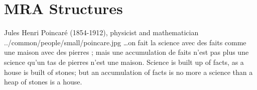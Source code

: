 ﻿%


\chapter{MRA Structures}
\qboxnpqt
  { Jules Henri Poincar\'e (1854-1912), physicist and mathematician
    \footnotemark
  }
  {../common/people/small/poincare.jpg}
  {\ldots on fait la science avec des faits comme une maison avec des pierres ;
   mais une accumulation de faits n'est pas plus une science qu'un tas de
   pierres n'est une maison.}
  {Science is built up of facts, as a house is built of stones;
   but an accumulation of facts is no more a science than a heap of stones is a house.}

